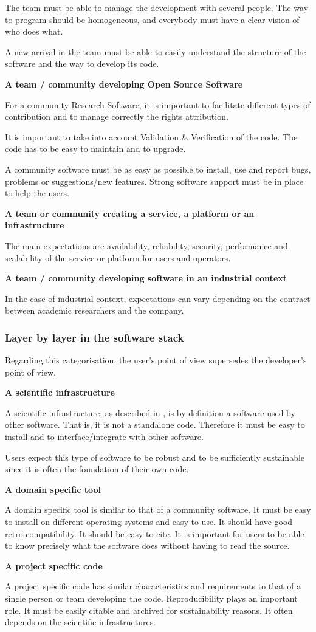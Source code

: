 The team must be able to manage the development with several people. The way to program should be homogeneous, and everybody must have a clear vision of who does what.

A new arrival in the team must be able to easily understand the structure of the software and the way to develop its code.

\textbf{A team / community developing Open Source Software}

For a community Research Software, it is important to facilitate different types of contribution and to manage correctly the rights attribution.

It is important to take into account Validation \& Verification of the code. The code has to be easy to maintain and to upgrade.

A community software must be as easy as possible to install, use and report bugs, problems or suggestions/new features. Strong software support must be in place to help the users.

\textbf{A team or community creating a service, a platform or an infrastructure}

The main expectations are availability, reliability, security, performance and scalability of the service or platform for users and operators.

\textbf{A team / community developing software in an industrial context}

In the case of industrial context, expectations can vary depending on the contract between academic researchers and the company.

\subsubsection{Layer by layer in the software stack}

Regarding this categorisation, the user's point of view supersedes the developer's point of view.

\textbf{A scientific infrastructure}

A scientific infrastructure, as described in \cite{hinsen2019}, is by definition a software used by other software. That is, it is not a standalone code. Therefore it must be easy to install and to interface/integrate with other software.

Users expect this type of software to be robust and to be sufficiently sustainable since it is often the foundation of their own code.

\textbf{A domain specific tool}

A domain specific tool is similar to that of a community software. It must be easy to install on different operating systems and easy to use. It should have good retro-compatibility. It should be easy to cite. It is important for users to be able to know precisely what the software does without having to read the source. 

\textbf{A project specific code}

A project specific code has similar characteristics and requirements to that of a single person or team developing the code. Reproducibility plays an important role. It must be easily citable and archived for sustainability reasons. It often depends on the scientific infrastructures.
